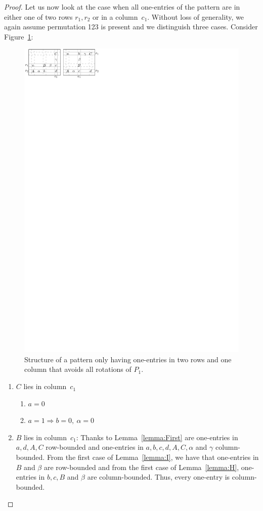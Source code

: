 \begin{proof}
Let us now look at the case when all one-entries of the pattern are in either one of two rows $r_1,r_2$ or in a column~$c_1$. Without loss of generality, we again assume permutation 123 is present and we distinguish three cases. Consider Figure~\ref{fig:twoplusone}:
\begin{figure}[!ht]
	\centering
	\includegraphics[width=120mm]{img/twoplusone.pdf}
	\caption{Structure of a pattern only having one-entries in two rows and one column that avoids all rotations of $P_1$.}
	\label{fig:twoplusone}
\end{figure}
\begin{enumerate}
\item $C$ lies in column~$c_1$
	\begin{enumerate}
		\item $a=0$
		\item $a=1\Rightarrow b=0,\ \alpha=0$
	\end{enumerate}
\item $B$ lies in column~$c_1$: Thanks to Lemma~\ref{lemma:First} are one-entries in $a,d,A,C$ row-bounded and one-entries in $a,b,c,d,A,C,\alpha$ and $\gamma$ column-bounded. From the first case of Lemma~\ref{lemma:I}, we have that one-entries in $B$ and $\beta$ are row-bounded and from the first case of Lemma~\ref{lemma:H}, one-entries in $b,c,B$ and $\beta$ are column-bounded. Thus, every one-entry is column-bounded.

\end{enumerate}
\end{proof}

